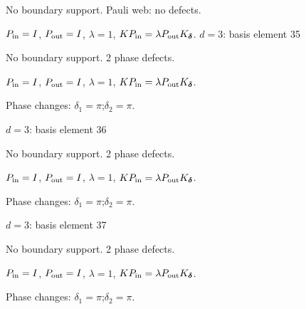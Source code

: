 No boundary support. Pauli web: no defects.
\begin{center}
\end{center}
\vspace{-1mm}
$P_{\rm in}=I$, \quad $P_{\rm out}=I$, \quad $\lambda=1$, \qquad $K P_{\rm in}=\lambda P_{\rm out}K_{\boldsymbol\delta}$.
\vfill
{\footnotesize\texttt{}}
\newpage
{}
{\Large $d=3$: basis element 35}\par
No boundary support. 2 phase defects.
\begin{center}
\end{center}
\vspace{-1mm}
$P_{\rm in}=I$, \quad $P_{\rm out}=I$, \quad $\lambda=1$, \qquad $K P_{\rm in}=\lambda P_{\rm out}K_{\boldsymbol\delta}$.
\par\smallskip\begin{minipage}{.98\linewidth}\small Phase changes: $\delta_{1}=\pi$;\quad $\delta_{2}=\pi$.\end{minipage}
\vfill
{\footnotesize\texttt{}}
\newpage
{}
{\Large $d=3$: basis element 36}\par
No boundary support. 2 phase defects.
\begin{center}
\end{center}
\vspace{-1mm}
$P_{\rm in}=I$, \quad $P_{\rm out}=I$, \quad $\lambda=1$, \qquad $K P_{\rm in}=\lambda P_{\rm out}K_{\boldsymbol\delta}$.
\par\smallskip\begin{minipage}{.98\linewidth}\small Phase changes: $\delta_{1}=\pi$;\quad $\delta_{2}=\pi$.\end{minipage}
\vfill
{\footnotesize\texttt{}}
\newpage
{}
{\Large $d=3$: basis element 37}\par
No boundary support. 2 phase defects.
\begin{center}
\end{center}
\vspace{-1mm}
$P_{\rm in}=I$, \quad $P_{\rm out}=I$, \quad $\lambda=1$, \qquad $K P_{\rm in}=\lambda P_{\rm out}K_{\boldsymbol\delta}$.
\par\smallskip\begin{minipage}{.98\linewidth}\small Phase changes: $\delta_{1}=\pi$;\quad $\delta_{2}=\pi$.\end{minipage}
